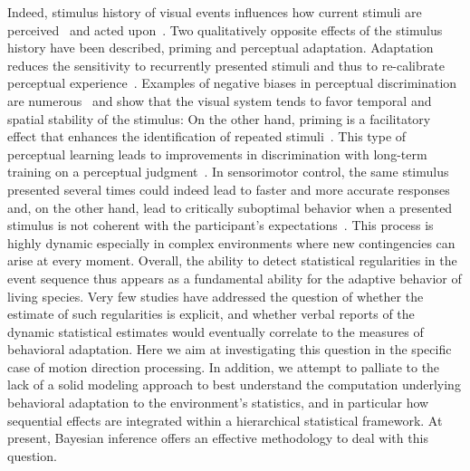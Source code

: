 \documentclass[12pt,english]{article}%
\newcommand{\citep}[1]{\parencite{#1}}
\begin{document}
Indeed, stimulus history of visual events influences
how current stimuli are perceived~\citep{Sotiropoulos2011, Adams12} and acted upon~\citep{Carpenter1995, Maus2015,Damasse18}.
Two qualitatively opposite effects of the stimulus history have been described, priming and perceptual adaptation. Adaptation reduces
the sensitivity to recurrently presented stimuli and
thus to re-calibrate perceptual experience~\citep{Clifford2007, Webster2011, Kohn2007}.
Examples of negative biases in perceptual discrimination are
numerous~\citep{REFFS} and show that the visual system tends
to favor temporal and spatial stability of the stimulus:
On the other hand, priming is a facilitatory effect that
enhances the identification of repeated stimuli~\citep{Verstraten1994, Tiest2009}.
This type of perceptual learning leads to improvements in discrimination
with long-term training on a perceptual judgment~\citep{Lu2009}.
In sensorimotor control,
the same stimulus presented several times could indeed
lead to faster and more accurate responses and,
on the other hand, lead to critically suboptimal behavior
when a presented stimulus is not coherent
with the participant's expectations~\citep{Hyman1953, Yu2009}.
This process is highly dynamic especially in complex environments
where new contingencies can arise at every moment.
Overall, the ability to detect
statistical regularities in the event sequence
thus appears as a fundamental ability
for the adaptive behavior of living species.
Very few studies have addressed the question of whether
the estimate of such regularities is explicit,
and whether verbal reports of the dynamic statistical
estimates would eventually correlate to the measures of behavioral adaptation. Here we aim at investigating this question in the specific case of motion direction processing.
In addition, we attempt to palliate to the lack of a solid modeling approach to best understand the computation underlying behavioral adaptation to the environment's statistics,
and in particular how sequential effects are integrated
within a hierarchical statistical framework.
At present, Bayesian inference offers an effective methodology
to deal with this question.
\end{document}

